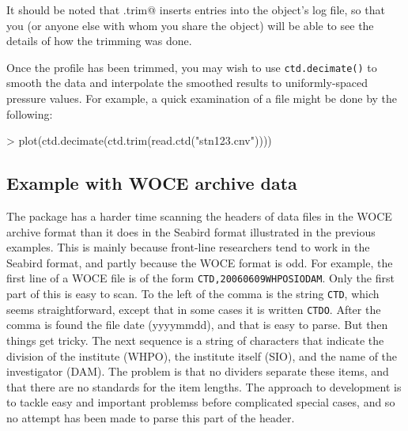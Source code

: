 \documentclass{article}
\begin{document}
It should be noted that \verb@ctd.trim@ inserts entries into the object's log
file, so that you (or anyone else with whom you share the object) will be able to
see the details of how the trimming was done.


Once the profile has been trimmed, you may wish to use \texttt{ctd.decimate()}
to smooth the data and interpolate the smoothed results to uniformly-spaced
pressure values. For example, a quick examination of a file might be done by the
following:
\begin{Schunk}
\begin{Sinput}
> plot(ctd.decimate(ctd.trim(read.ctd("stn123.cnv"))))
\end{Sinput}
\end{Schunk}

\subsection{Example with WOCE archive data}

The package has a harder time scanning the headers of data files in the WOCE
archive format than it does in the Seabird format illustrated in the previous
examples. This is mainly because front-line researchers tend to work in the
Seabird format, and partly because the WOCE format is odd. For example, the
first line of a WOCE file is of the form \texttt{CTD,20060609WHPOSIODAM}.  Only
the first part of this is easy to scan. To the left of the comma is the string
\texttt{CTD}, which seems straightforward, except that in some cases it is
written \texttt{CTDO}. After the comma is found the file date (yyyymmdd), and
that is easy to parse. But then things get tricky.  The next sequence is a
string of characters that indicate the division of the institute (WHPO), the
institute itself (SIO), and the name of the investigator (DAM). The problem is
that no dividers separate these items, and that there are no standards for the
item lengths. The approach to \verb@oce@ development is to tackle easy and
important problemss before complicated special cases, and so no attempt has been
made to parse this part of the header.
\end{document}
